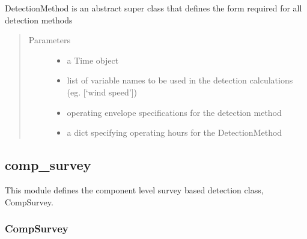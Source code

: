 \documentclass[letterpaper,10pt,english]{sphinxmanual}
\begin{document}
\begin{fulllineitems}
\label{\detokenize{index:feast.DetectionModules.abstract_detection_method.DetectionMethod}}
DetectionMethod is an abstract super class that defines the form required for all detection methods
\begin{quote}\begin{description}
\item[{Parameters}] \leavevmode\begin{itemize}
\item {} 
 \textendash{} a Time object

\item {} 
 \textendash{} list of variable names to be used in the detection calculations (eg. {[}‘wind speed’{]})

\item {} 
 \textendash{} operating envelope specifications for the detection method

\item {} 
 \textendash{} a dict specifying operating hours for the DetectionMethod

\end{itemize}

\end{description}\end{quote}

\end{fulllineitems}



\subsection{comp\_survey}
\label{\detokenize{index:module-feast.DetectionModules.comp_survey}}\label{\detokenize{index:comp-survey}}
This module defines the component level survey based detection class, CompSurvey.


\subsubsection{CompSurvey}
\label{\detokenize{index:compsurvey}}
\end{document}
